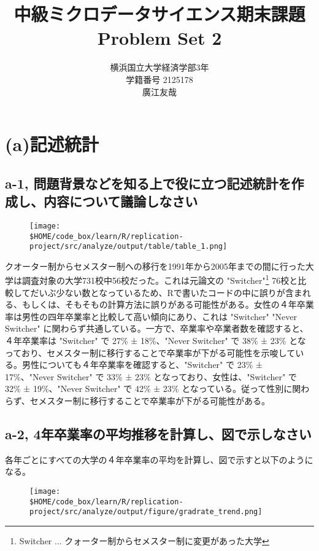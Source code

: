 \documentclass[a4paper]{jsarticle}
\title{中級ミクロデータサイエンス期末課題\\Problem Set 2}
\author{横浜国立大学経済学部3年\\学籍番号 2125178\\廣江友哉}
\begin{document}
\maketitle

\section*{(a)記述統計}

\subsection*{a-1, 問題背景などを知る上で役に立つ記述統計を作成し、内容について議論しなさい}
\begin{figure}[h]
  \centering
  \texttt{[image: \\\$HOME/code\_box/learn/R/replication-project/src/analyze/output/table/table\_1.png]}

\end{figure}

クオーター制からセメスター制への移行を1991年から2005年までの間に行った大学は調査対象の大学731校中56校だった。これは元論文の "Switcher"\footnote{Switcher ... クォーター制からセメスター制に変更があった大学} 76校と比較してだいぶ少ない数となっているため、Rで書いたコードの中に誤りが含まれる、もしくは、そもそもの計算方法に誤りがある可能性がある。女性の４年卒業率は男性の四年卒業率と比較して高い傾向にあり、これは "Switcher" "Never Switcher" に関わらず共通している。一方で、卒業率や卒業者数を確認すると、４年卒業率は "Switcher" で 27\% ± 18\%、"Never Switcher" で 38\% ± 23\% となっており、セメスター制に移行することで卒業率が下がる可能性を示唆している。男性についても４年卒業率を確認すると、"Switcher" で 23\% ± 17\%、"Never Switcher" で 33\% ± 23\% となっており、女性は、"Switcher" で 32\% ± 19\%、"Never Switcher" で 42\% ± 23\% となっている。従って性別に関わらず、セメスター制に移行することで卒業率が下がる可能性がある。

\subsection*{a-2, 4年卒業率の平均推移を計算し、図で示しなさい}

各年ごとにすべての大学の４年卒業率の平均を計算し、図で示すと以下のようになる。

\begin{figure}[H]
  \centering
  \texttt{[image: \\\$HOME/code\_box/learn/R/replication-project/src/analyze/output/figure/gradrate\_trend.png]}

\end{figure}
\end{document}
